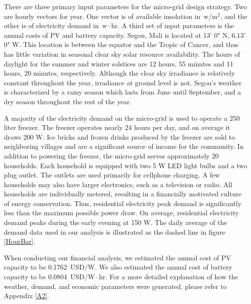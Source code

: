 \documentclass{article}
\newcommand{\unit}[1]{\ensuremath{\, \mathrm{#1}}}
\begin{document}

There are three primary input parameters for the micro-grid design strategy. 
Two are hourly vectors for year. One vector is of available insolation in \unit{w/m^2}, and the other is of electricity demand in \unit{w\! \cdot \! hr}.
A third set of input parameters is the annual costs of PV and battery capacity. 
%
%
Segou, Mali is located at 13' 0" N, 6.13' 0" W. 
This location is between the equator and the Tropic of Cancer, and thus has little variation in seasonal clear sky solar resource availability. 
The hours of daylight for the summer and winter solstices are 12 hours, 55 minutes and 11 hours, 20 minutes, respectively.  
Although the clear sky irradiance is relatively constant throughout the year, irradiance at ground level is not.
Segou's weather is characterized by a rainy season which lasts from June until September, and a dry season throughout the rest of the year. 

A majority of the electricity demand on the micro-grid is used to operate
a 250 liter freezer.
The freezer operates nearly 24 hours per day, and on average it draws 200 W. 
Ice bricks and frozen drinks produced by the freezer are sold to neighboring villages and are a significant source of income for the community.
In addition to powering the freezer, the micro-grid serves approximately 20 households.
Each household is equipped with two 5 W LED light bulbs and a two plug outlet. 
The outlets are used primarily for cellphone charging.
A few households may also have larger electronics, such as a television or radio.
All households are individually metered, resulting in a financially motivated culture of energy conservation. 
Thus, residential electricity peak demand is significantly less than the maximum possible power draw. 
On average, residential electricity demand peaks during the early evening at 150 W.
The daily average of the demand data used in our analysis is illustrated as the dashed line in figure \ref{HourBar}.

When conducting our financial analysis, we estimated the annual cost of PV capacity to be 0.1762 \unit{USD/W}.
We also estimated the annual cost of battery capacity to be 0.0804 \unit{USD/ W  \! \cdot \! hr}. 
For a more detailed explanation of how the weather, demand, and economic parameters were generated, please refer to Appendix \ref{A2}.
\end{document}
